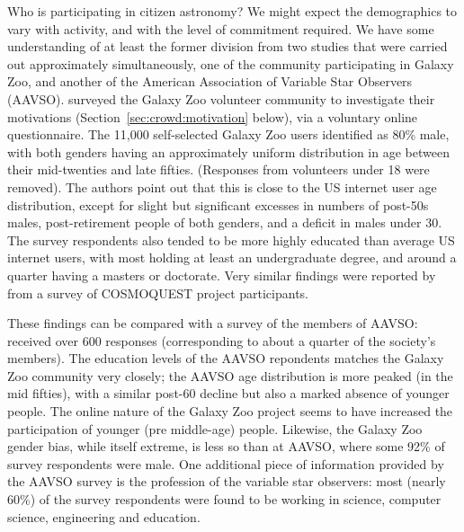 \documentclass{ar2e}
\def\Sref#1{Section~\ref{#1}\xspace}
\begin{document}
Who is participating in citizen astronomy? We might expect the demographics to
vary with activity, and with the level of commitment required. We have some
understanding of at least the former division from two studies that were
carried out approximately simultaneously, one of the community  participating
in Galaxy Zoo, and another of the American Association of Variable Star
Observers (AAVSO).  \citet{Rad++2013} surveyed the Galaxy Zoo volunteer
community to investigate their motivations (\Sref{sec:crowd:motivation}
below), via a voluntary online questionnaire. The 11,000 self-selected Galaxy
Zoo users identified as 80\% male, with both genders having an approximately
uniform distribution in age between their mid-twenties and late fifties.
(Responses from volunteers under 18 were removed). The
authors point out that this is close to the US internet user age distribution,
except for slight but significant excesses in numbers of post-50s males,
post-retirement people of both genders, and a deficit in males under 30. The
survey respondents  also tended to be more highly educated than average US
internet users, with most holding at least an undergraduate degree, and around
a quarter having a masters or doctorate. Very similar findings were reported
by \citet{COSMOQUESTsurvey} from a survey of COSMOQUEST project participants.

These findings can be compared with a survey of the members of AAVSO:
\citet{P+P2012} received over 600 responses (corresponding to about a quarter
of the society's members). The education levels of
the AAVSO repondents matches the Galaxy Zoo community very closely; the AAVSO
age distribution is more peaked (in the mid fifties), with a similar post-60
decline but also a marked absence of younger people. The online nature of the
Galaxy Zoo project seems to have increased the participation of younger (pre
middle-age) people. Likewise, the Galaxy Zoo gender bias, while itself
extreme, is less so than at AAVSO, where some 92\% of survey respondents were
male. One additional piece of information provided by the AAVSO survey is the
profession of the variable star observers: most (nearly 60\%) of the survey
respondents were found to be working in science, computer science, engineering
and education. 
\end{document}
